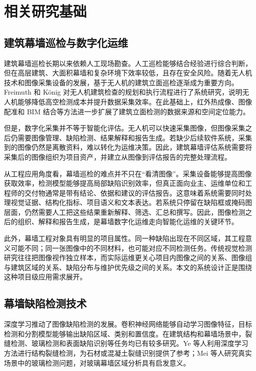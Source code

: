 \chapter{相关研究基础}
\label{chap:related-work}

\section{建筑幕墙巡检与数字化运维}
\label{sec:related-facade-inspection}

建筑幕墙巡检长期以来依赖人工现场勘查。人工巡检能够结合经验进行综合判断，但在高层建筑、大面积幕墙和复杂环境下效率较低，且存在安全风险。随着无人机技术和图像采集设备的发展，基于无人机的建筑立面巡检逐渐成为重要方向。Freimuth 和 K{\"o}nig 对无人机建筑检查的规划和执行流程进行了系统研究，说明无人机能够降低高空检测成本并提升数据采集效率\cite{freimuth2018uav}。在此基础上，红外热成像、图像配准和 BIM 结合等方法进一步扩展了建筑立面检测的数据来源和空间定位能力\cite{li2024facade,zhang2023uavbim}。

但是，数字化采集并不等于智能化评估。无人机可以快速采集图像，但图像采集之后仍需要图像管理、缺陷检测、结果解释和报告生成。若缺少后续软件系统，采集到的图像仍然是离散资料，难以转化为运维决策。因此，建筑幕墙评估系统需要将采集后的图像组织为项目资产，并建立从图像到评估报告的完整处理流程。

从工程应用角度看，幕墙巡检的难点并不只在“看清图像”。采集设备能够提高图像获取效率，检测模型能够提高局部缺陷识别效率，但真正面向业主、运维单位和工程师的交付物通常是带有结论、依据和建议的评估报告。这意味着系统需要同时处理视觉证据、结构化指标、项目语义和文本表达。若系统只停留在缺陷框或掩码图层面，仍然需要人工把这些结果重新解释、筛选、汇总和撰写。因此，图像检测之后的组织、解释和报告生成，是幕墙数字化运维走向智能化运维的关键环节。

此外，幕墙工程对象具有明显的项目属性。同一种缺陷出现在不同区域，其工程意义可能不同；同一张图像中的不同材料，也可能对应不同检测任务。传统视觉检测研究往往把图像视作独立样本，而实际运维更关心项目内图像之间的关系、图像组与建筑区域的关系、缺陷分布与维护优先级之间的关系。本文的系统设计正是围绕这种项目级应用需求展开。

\section{幕墙缺陷检测技术}
\label{sec:related-defect-detection}

深度学习推动了图像缺陷检测的发展。卷积神经网络能够自动学习图像特征，目标检测和分割模型能够输出缺陷区域、类别和置信度\cite{article1,conf1}。在建筑结构和幕墙场景中，裂缝检测、玻璃检测和表面缺陷识别等任务均已有较多研究。Ye 等人利用深度学习方法进行结构裂缝检测，为石材或混凝土裂缝识别提供了参考\cite{ye2019crack}；Mei 等人研究真实场景中的玻璃检测问题，对玻璃幕墙区域分析具有启发意义\cite{mei2020glass}。

